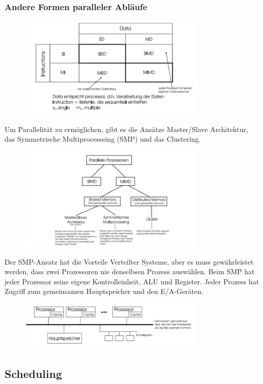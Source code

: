 \documentclass{article}
\begin{document}
\subsubsection{Andere Formen paralleler Abläufe}
    \begin{figure}[H]
        \centering
	    \includegraphics[width=90mm]{Skizzen/2_Kapitel/paralleke_prozessoren.png}
    \end{figure}
    Um Parallelität zu ermöglichen, gibt es die Ansätze Master/Slave Architektur, das Symmetrische Multiprocesseing (SMP) und das Clustering.
    \begin{figure}[H]
        \centering
	    \includegraphics[width=90mm]{Skizzen/2_Kapitel/parallel_prozessoren_bild.png}
    \end{figure}
    Der SMP-Ansatz hat die Vorteile Verteilter Systeme, aber es muss gewährleistet werden, dass zwei Prozessoren nie denselbsen Prozess auswählen. Beim SMP hat jeder Prozessor seine eigene Kontrolleinheit, ALU und Register. Jeder Prozess hat Zugriff zum gemeinsamen Hauptspeicher und den E/A-Geräten.
    \begin{figure}[H]
        \centering
	    \includegraphics[width=90mm]{Skizzen/2_Kapitel/smp.png}
    \end{figure}
\subsection{Scheduling}
\end{document}

